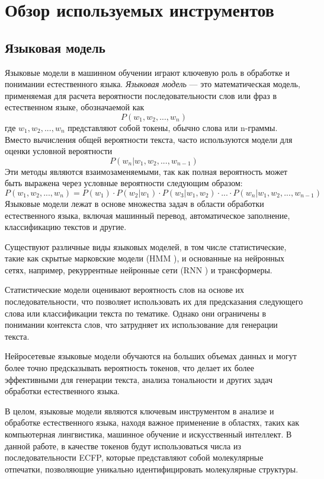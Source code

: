 \section{Обзор используемых инструментов}
\label{sec:Chapter2} 
\subsection{Языковая модель}
Языковые модели в машинном обучении играют ключевую роль в обработке и понимании естественного языка. \textit{Языковая модель} — это математическая модель, применяемая для расчета вероятности последовательности слов или фраз в естественном языке, обозначаемой как 
$$P(w_1, w_2, ..., w_n)$$
где \(w_1, w_2,..., w_n\) представляют собой токены, обычно слова или n-граммы. Вместо вычисления общей вероятности текста, часто используются модели для оценки условной вероятности 
$$P(w_n| w_1, w_2, ..., w_{n-1})$$
Эти методы являются взаимозаменяемыми, так как полная вероятность может быть выражена через условные вероятности следующим образом:
$$
P(w_1, w_2, ..., w_n) = P(w_1) \cdot P(w_2|w_1) \cdot P(w_3|w_1, w_2) \cdot ... \cdot P(w_n | w_1, w_2, ..., w_{n-1})
$$
Языковые модели лежат в основе множества задач в области обработки естественного языка, включая машинный перевод, автоматическое заполнение, классификацию текстов и другие.

Существуют различные виды языковых моделей, в том числе статистические, такие как скрытые марковские модели (HMM \cite{hmm}), и основанные на нейронных сетях, например, рекуррентные нейронные сети (RNN \cite{Das2023}) и трансформеры.

Статистические модели оценивают вероятность слов на основе их последовательности, что позволяет использовать их для предсказания следующего слова или классификации текста по тематике. Однако они ограничены в понимании контекста слов, что затрудняет их использование для генерации текста.

Нейросетевые языковые модели обучаются на больших объемах данных и могут более точно предсказывать вероятность токенов, что делает их более эффективными для генерации текста, анализа тональности и других задач обработки естественного языка.

В целом, языковые модели являются ключевым инструментом в анализе и обработке естественного языка, находя важное применение в областях, таких как компьютерная лингвистика, машинное обучение и искусственный интеллект. В данной работе, в качестве токенов будут использоваться числа из последовательности ECFP, которые представляют собой молекулярные отпечатки, позволяющие уникально идентифицировать молекулярные структуры.


